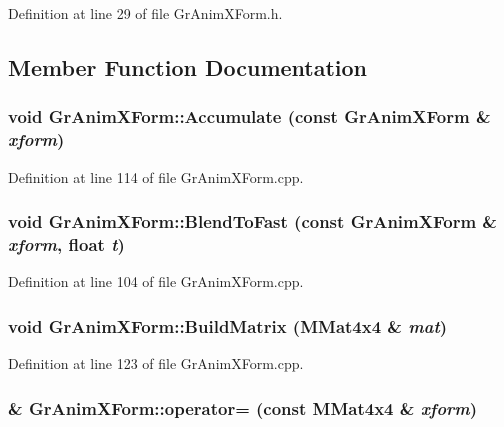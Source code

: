 Definition at line 29 of file GrAnimXForm.h.

\subsection{Member Function Documentation}
\hypertarget{class_gr_anim_x_form_cbda54501f740973df16cd03c9d0d75b}{
\subsubsection[{Accumulate}]{\setlength{\rightskip}{0pt plus 5cm}void GrAnimXForm::Accumulate (const {\bf GrAnimXForm} \& {\em xform})}}
\label{class_gr_anim_x_form_cbda54501f740973df16cd03c9d0d75b}




Definition at line 114 of file GrAnimXForm.cpp.\hypertarget{class_gr_anim_x_form_0147d7336963feb4caafcf7d87c4307b}{
\subsubsection[{BlendToFast}]{\setlength{\rightskip}{0pt plus 5cm}void GrAnimXForm::BlendToFast (const {\bf GrAnimXForm} \& {\em xform}, \/  float {\em t})}}
\label{class_gr_anim_x_form_0147d7336963feb4caafcf7d87c4307b}




Definition at line 104 of file GrAnimXForm.cpp.\hypertarget{class_gr_anim_x_form_a0608b1365ddab9512aeb10827b42d4a}{
\subsubsection[{BuildMatrix}]{\setlength{\rightskip}{0pt plus 5cm}void GrAnimXForm::BuildMatrix ({\bf MMat4x4} \& {\em mat})}}
\label{class_gr_anim_x_form_a0608b1365ddab9512aeb10827b42d4a}




Definition at line 123 of file GrAnimXForm.cpp.\hypertarget{class_gr_anim_x_form_160982d52c32e88584f651876d18f409}{
\subsubsection[{operator=}]{ \& GrAnimXForm::operator= (const {\bf MMat4x4} \& {\em xform})}}
\label{class_gr_anim_x_form_160982d52c32e88584f651876d18f409}




